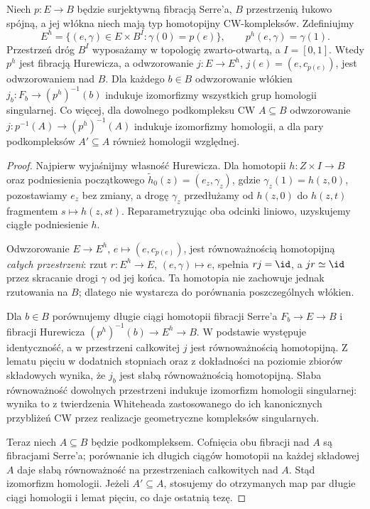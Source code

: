 \begin{lemat}
\label{lem:serre-mappingpath-v6}
Niech $p:E\to B$ będzie surjektywną fibracją Serre'a, $B$ przestrzenią
łukowo spójną, a jej włókna niech mają typ homotopijny CW-kompleksów.
Zdefiniujmy
\[
E^h=\{(e,\gamma)\in E\times B^I:\gamma(0)=p(e)\},\qquad
p^h(e,\gamma)=\gamma(1).
\]
Przestrzeń dróg $B^I$ wyposażamy w topologię zwarto-otwartą,
a $I=[0,1]$. Wtedy $p^h$ jest fibracją Hurewicza, a odwzorowanie
$j:E\to E^h$, $j(e)=(e,c_{p(e)})$, jest odwzorowaniem nad $B$.
Dla każdego $b\in B$ odwzorowanie włókien
$j_b:F_b\to (p^h)^{-1}(b)$ indukuje izomorfizmy
wszystkich grup homologii singularnej.
Co więcej, dla dowolnego podkompleksu CW $A\subseteq B$
odwzorowanie $j:p^{-1}(A)\to(p^h)^{-1}(A)$ indukuje
izomorfizmy homologii, a dla pary podkompleksów
$A'\subseteq A$ również homologii względnej.
\end{lemat}
\begin{proof}
Najpierw wyjaśnijmy własność Hurewicza. Dla homotopii
$h:Z\times I\to B$ oraz podniesienia początkowego
$\widetilde h_0(z)=(e_z,\gamma_z)$, gdzie
$\gamma_z(1)=h(z,0)$, pozostawiamy $e_z$ bez zmiany,
a drogę $\gamma_z$ przedłużamy od $h(z,0)$ do $h(z,t)$
fragmentem $s\mapsto h(z,st)$. Reparametryzując oba
odcinki liniowo, uzyskujemy ciągłe podniesienie $h$.

Odwzorowanie $E\to E^h$, $e\mapsto(e,c_{p(e)})$, jest
równoważnością homotopijną \emph{całych przestrzeni}: rzut
$r:E^h\to E$, $(e,\gamma)\mapsto e$, spełnia $rj=\id$,
a $jr\simeq\id$ przez skracanie drogi $\gamma$ od jej końca.
Ta homotopia nie zachowuje jednak rzutowania na $B$;
dlatego nie wystarcza do porównania poszczególnych włókien.

Dla $b\in B$ porównujemy długie ciągi homotopii
fibracji Serre'a $F_b\to E\to B$ i fibracji Hurewicza
$(p^h)^{-1}(b)\to E^h\to B$. W podstawie występuje
identyczność, a w przestrzeni całkowitej $j$ jest
równoważnością homotopijną. Z lematu pięciu w dodatnich
stopniach oraz z dokładności na poziomie zbiorów składowych
wynika, że $j_b$ jest słabą równoważnością homotopijną.
Słaba równoważność dowolnych przestrzeni indukuje
izomorfizm homologii singularnej: wynika to z twierdzenia
Whiteheada zastosowanego do ich kanonicznych przybliżeń CW
przez realizacje geometryczne kompleksów singularnych.

Teraz niech $A\subseteq B$ będzie podkompleksem.
Cofnięcia obu fibracji nad $A$ są fibracjami Serre'a;
porównanie ich długich ciągów homotopii na każdej składowej
$A$ daje słabą równoważność na przestrzeniach całkowitych
nad $A$. Stąd izomorfizm homologii. Jeżeli
$A'\subseteq A$, stosujemy do otrzymanych map par
długie ciągi homologii i lemat pięciu, co daje ostatnią tezę.
\end{proof}

